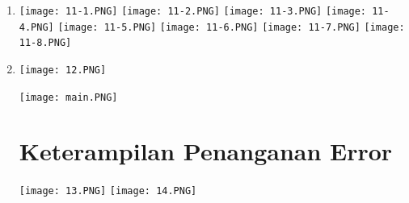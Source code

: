 \documentclass{article}
\begin{document}
\begin{enumerate}
\item
\begin{center}
    \texttt{[image: 11-1.PNG]}
    \texttt{[image: 11-2.PNG]}
    \texttt{[image: 11-3.PNG]}
    \texttt{[image: 11-4.PNG]}
    \texttt{[image: 11-5.PNG]}
    \texttt{[image: 11-6.PNG]}
    \texttt{[image: 11-7.PNG]}
    \texttt{[image: 11-8.PNG]}
           
\end{center}

\item 
\begin{center}
    \texttt{[image: 12.PNG]}
    
    \texttt{[image: main.PNG]}

\end{center}

\section{Keterampilan Penanganan Error}
\begin{center}
    \texttt{[image: 13.PNG]}
    \texttt{[image: 14.PNG]}
\end{center}


\end{enumerate}
\end{document}
